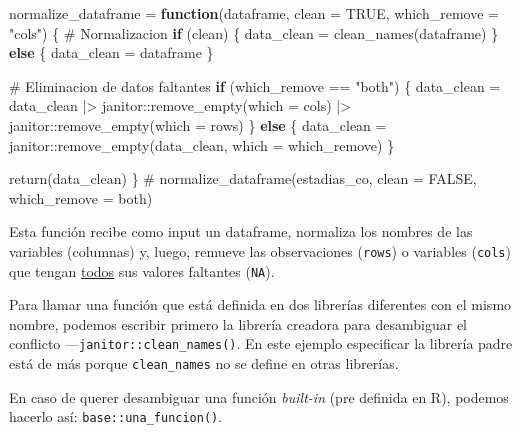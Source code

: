 \documentclass[
  spanish,
  letterpaper,
  DIV=11,
  numbers=noendperiod]{scrartcl}
\newenvironment{Shaded}{\begin{snugshade}}{\end{snugshade}}
\newcommand{\AttributeTok}[1]{\textcolor[rgb]{0.40,0.45,0.13}{#1}}
\newcommand{\CommentTok}[1]{\textcolor[rgb]{0.37,0.37,0.37}{#1}}
\newcommand{\ConstantTok}[1]{\textcolor[rgb]{0.56,0.35,0.01}{#1}}
\newcommand{\ControlFlowTok}[1]{\textcolor[rgb]{0.00,0.23,0.31}{\textbf{#1}}}
\newcommand{\FunctionTok}[1]{\textcolor[rgb]{0.28,0.35,0.67}{#1}}
\newcommand{\NormalTok}[1]{\textcolor[rgb]{0.00,0.23,0.31}{#1}}
\newcommand{\OtherTok}[1]{\textcolor[rgb]{0.00,0.23,0.31}{#1}}
\newcommand{\SpecialCharTok}[1]{\textcolor[rgb]{0.37,0.37,0.37}{#1}}
\newcommand{\StringTok}[1]{\textcolor[rgb]{0.13,0.47,0.30}{#1}}
\begin{document}
\begin{Shaded}
\begin{Highlighting}[]
\NormalTok{normalize\_dataframe }\OtherTok{=} \ControlFlowTok{function}\NormalTok{(dataframe, }\AttributeTok{clean =} \ConstantTok{TRUE}\NormalTok{, }\AttributeTok{which\_remove =} \StringTok{"cols"}\NormalTok{) \{}
  \CommentTok{\# Normalizacion}
  \ControlFlowTok{if}\NormalTok{ (clean) \{}
\NormalTok{    data\_clean }\OtherTok{=} \FunctionTok{clean\_names}\NormalTok{(dataframe)}
\NormalTok{  \} }\ControlFlowTok{else}\NormalTok{ \{}
\NormalTok{    data\_clean }\OtherTok{=}\NormalTok{ dataframe}
\NormalTok{  \}}
  
  \CommentTok{\# Eliminacion de datos faltantes}
  \ControlFlowTok{if}\NormalTok{ (which\_remove }\SpecialCharTok{==} \StringTok{"both"}\NormalTok{) \{}
\NormalTok{    data\_clean }\OtherTok{=}\NormalTok{ data\_clean }\SpecialCharTok{|\textgreater{}} 
\NormalTok{      janitor}\SpecialCharTok{::}\FunctionTok{remove\_empty}\NormalTok{(}\AttributeTok{which =} \StringTok{\textquotesingle{}cols\textquotesingle{}}\NormalTok{) }\SpecialCharTok{|\textgreater{}} 
\NormalTok{      janitor}\SpecialCharTok{::}\FunctionTok{remove\_empty}\NormalTok{(}\AttributeTok{which =} \StringTok{\textquotesingle{}rows\textquotesingle{}}\NormalTok{)}
\NormalTok{  \} }\ControlFlowTok{else}\NormalTok{ \{}
\NormalTok{    data\_clean }\OtherTok{=}\NormalTok{ janitor}\SpecialCharTok{::}\FunctionTok{remove\_empty}\NormalTok{(data\_clean, }\AttributeTok{which =}\NormalTok{ which\_remove)}
\NormalTok{  \}}
  
  \FunctionTok{return}\NormalTok{(data\_clean)}
\NormalTok{\}}
\CommentTok{\# normalize\_dataframe(estadias\_co, clean = FALSE, which\_remove = \textquotesingle{}both\textquotesingle{})}
\end{Highlighting}
\end{Shaded}

Esta función recibe como input un dataframe, normaliza los nombres de
las variables (columnas) y, luego, remueve las observaciones
(\texttt{rows}) o variables (\texttt{cols}) que tengan \ul{todos} sus
valores faltantes (\texttt{NA}).

Para llamar una función que está definida en dos librerías diferentes
con el mismo nombre, podemos escribir primero la librería creadora para
desambiguar el conflicto ---\texttt{janitor::clean\_names()}. En este
ejemplo especificar la librería padre está de más porque
\texttt{clean\_names} no se define en otras librerías.

En caso de querer desambiguar una función \emph{built-in} (pre definida
en R), podemos hacerlo así: \texttt{base::una\_funcion()}.
\end{document}
